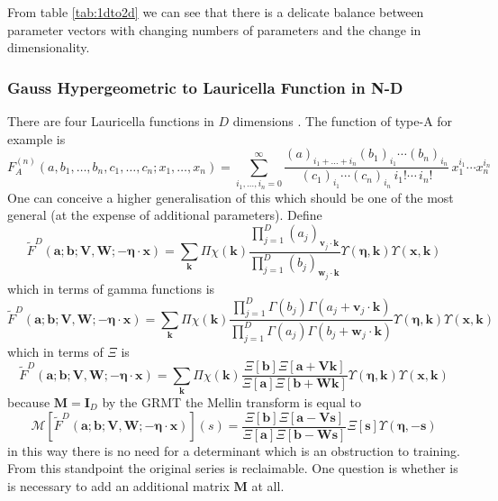 \documentclass[journal=jcisd8,manuscript=article,layout=onecolumn,pdftex,floatfix,amsmath,amssymb,10pt]{achemso}
\begin{document}
From table \ref{tab:1dto2d} we can see that there is a delicate balance between parameter vectors with changing numbers of parameters and the change in dimensionality.

\subsubsection{Gauss Hypergeometric to Lauricella Function in N-D}
There are four Lauricella functions in $D$ dimensions \cite{}. The function of type-A for example is
\begin{equation}
F_A^{(n)}(a, b_1,\ldots,b_n, c_1,\ldots,c_n; x_1,\ldots,x_n) = 
\sum_{i_1,\ldots,i_n=0}^{\infty} \frac{(a)_{i_1+\ldots+i_n} (b_1)_{i_1} \cdots (b_n)_{i_n}} {(c_1)_{i_1} \cdots (c_n)_{i_n} \,i_1! \cdots \,i_n!} \,x_1^{i_1} \cdots x_n^{i_n}
\end{equation}
One can conceive a higher generalisation of this which should be one of the most general (at the expense of additional parameters). Define
\begin{equation}
\tilde{F}^{D}(\mathbf{a};\mathbf{b};\mathbf{V,W};-\boldsymbol\eta \cdot\mathbf{x}) = \sum_{\mathbf{k}} \Pi\chi(\mathbf{k})\frac{\prod_{j=1}^D (a_j)_{\mathbf{v}_j \cdot \mathbf{k}}}{\prod_{j=1}^D (b_j)_{\mathbf{w}_j \cdot \mathbf{k}}} \Upsilon(\boldsymbol\eta,\mathbf{k})\Upsilon(\mathbf{x},\mathbf{k})
\end{equation}
which in terms of gamma functions is 
\begin{equation}
\tilde{F}^{D}(\mathbf{a};\mathbf{b};\mathbf{V,W};-\boldsymbol\eta \cdot\mathbf{x}) = \sum_{\mathbf{k}} \Pi\chi(\mathbf{k})\frac{\prod_{j=1}^D \Gamma(b_j)\Gamma(a_j + \mathbf{v}_j\cdot \mathbf{k})}{\prod_{j=1}^D \Gamma(a_j)\Gamma(b_j+\mathbf{w}_j\cdot \mathbf{k})} \Upsilon(\boldsymbol\eta,\mathbf{k})\Upsilon(\mathbf{x},\mathbf{k})
\end{equation}
which in terms of $\Xi$ is
\begin{equation}
\tilde{F}^{D}(\mathbf{a};\mathbf{b};\mathbf{V,W};-\boldsymbol\eta \cdot\mathbf{x}) = \sum_{\mathbf{k}} \Pi\chi(\mathbf{k})\frac{\Xi[\mathbf{b}]\Xi[\mathbf{a}+\mathbf{Vk}]}{\Xi[\mathbf{a}]\Xi[\mathbf{b+Wk}]} \Upsilon(\boldsymbol\eta,\mathbf{k})\Upsilon(\mathbf{x},\mathbf{k})
\end{equation}
because $\mathbf{M}=\mathbf{I}_D$ by the GRMT the Mellin transform is equal to \begin{equation}
\mathcal{M}[\tilde{F}^{D}(\mathbf{a};\mathbf{b};\mathbf{V,W};-\boldsymbol\eta \cdot\mathbf{x})](s) = \frac{\Xi[\mathbf{b}]\Xi[\mathbf{a}-\mathbf{Vs}]}{\Xi[\mathbf{a}]\Xi[\mathbf{b-Ws}]}\Xi[\mathbf{s}]\Upsilon(\boldsymbol\eta,-\mathbf{s})
\end{equation}
in this way there is no need for a determinant which is an obstruction to training. From this standpoint the original series is reclaimable. One question is whether is is necessary to add an additional matrix $\mathbf{M}$ at all.
\end{document}
